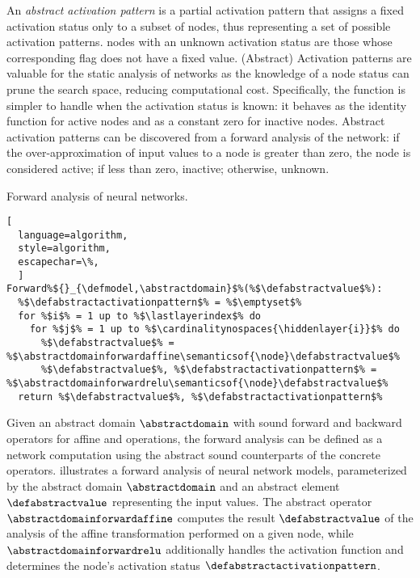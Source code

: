 An \emph{abstract activation pattern} is a partial activation pattern that assigns a fixed activation status only to a subset of \relu{} nodes, thus representing a set of possible activation patterns. \relu{} nodes with an unknown activation status are those whose corresponding flag does not have a fixed value. (Abstract) Activation patterns are valuable for the static analysis of networks as the knowledge of a node status can prune the search space, reducing computational cost. Specifically, the \relu{} function is simpler to handle when the activation status is known: it behaves as the identity function for active nodes and as a constant zero for inactive nodes. Abstract activation patterns can be discovered from a forward analysis of the network: if the over-approximation of input values to a node is greater than zero, the node is considered active; if less than zero, inactive; otherwise, unknown.


\begin{marginalgorithm}
  \caption{Forward analysis of neural networks.}
\begin{lstlisting}[
  language=algorithm,
  style=algorithm,
  escapechar=\%,
  ]
Forward%${}_{\defmodel,\abstractdomain}$%(%$\defabstractvalue$%):
  %$\defabstractactivationpattern$% = %$\emptyset$%
  for %$i$% = 1 up to %$\lastlayerindex$% do
    for %$j$% = 1 up to %$\cardinalitynospaces{\hiddenlayer{i}}$% do
      %$\defabstractvalue$% = %$\abstractdomainforwardaffine\semanticsof{\node}\defabstractvalue$%
      %$\defabstractvalue$%, %$\defabstractactivationpattern$% = %$\abstractdomainforwardrelu\semanticsof{\node}\defabstractvalue$%
  return %$\defabstractvalue$%, %$\defabstractactivationpattern$%
\end{lstlisting}
\end{marginalgorithm}




Given an abstract domain $\abstractdomain$ with sound forward and backward operators for affine and \relu{} operations, the forward analysis can be defined as a network computation using the abstract sound counterparts of the concrete operators.  illustrates a forward analysis of neural network models, parameterized by the abstract domain $\abstractdomain$ and an abstract element $\defabstractvalue$ representing the input values. The abstract operator $\abstractdomainforwardaffine$ computes the result $\defabstractvalue$ of the analysis of the
affine transformation performed on a given node, while $\abstractdomainforwardrelu$ additionally handles the \relu{} activation function and determines the node's activation status $\defabstractactivationpattern$.

